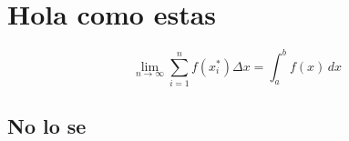 \documentclass[../main.tex]{subfiles}
\begin{document}
    \chapter{Hola como estas}
    \[
        \lim_{n\to\infty} \sum_{i=1}^n f(x_i^*)\Delta x = \int_a^b f(x)\, dx
    \]

    \section*{No lo se}
    
\end{document}
